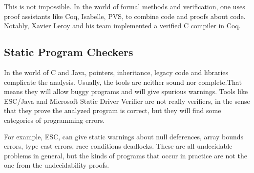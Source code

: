 \documentclass[12pt]{article}
\begin{document}
This is not impossible. In the world of formal methods and verification, one uses proof assistants like Coq, Isabelle, PVS, to combine code and proofs about code. Notably, Xavier Leroy and his team implemented a verified C compiler \cite{compcert} in Coq. 

\subsection{Static Program Checkers}

In the world of C and Java, pointers, inheritance, legacy code and libraries complicate the analysis. Usually, the tools are neither sound nor complete.That means they will allow buggy programs and will give spurious warnings. Tools like ESC/Java \cite{esc} and Microsoft Static Driver Verifier \cite{SDV} are not really verifiers, in the sense that they prove the analyzed program is correct, but they will find some categories of programming errors.

For example, ESC, can give static warnings about null deferences, array bounds errors, type cast errors, race conditions deadlocks. These are all undecidable problems in general, but the kinds of programs that occur in practice are not the one from the undecidability proofs.
\end{document}
